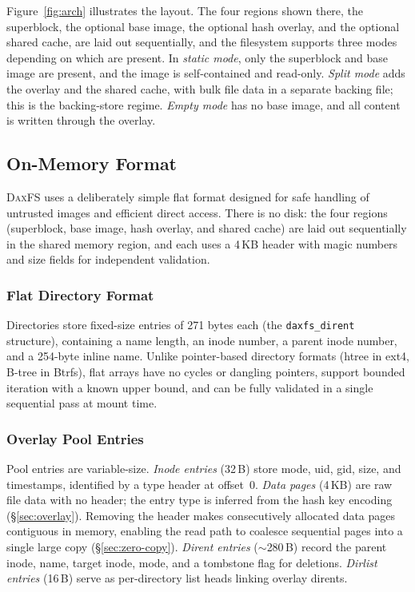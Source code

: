 \documentclass[letterpaper,twocolumn,10pt]{article}
\newcommand{\daxfs}{\textsc{DaxFS}\xspace}
\begin{document}
Figure~\ref{fig:arch} illustrates the layout.  The four regions shown
there, the superblock, the optional base image, the optional hash
overlay, and the optional shared cache, are laid out sequentially, and
the filesystem supports three modes depending on which are present.
In \emph{static mode}, only the superblock and base image are present,
and the image is self-contained and read-only.  \emph{Split mode} adds
the overlay and the shared cache, with bulk file data in a separate
backing file; this is the backing-store regime.  \emph{Empty mode} has
no base image, and all content is written through the overlay.

\subsection{On-Memory Format}
\label{sec:format}

\daxfs uses a deliberately simple flat format designed for safe
handling of untrusted images and efficient direct access.  There is no
disk: the four regions (superblock, base image, hash overlay, and
shared cache) are laid out sequentially in the shared memory region,
and each uses a 4\,KB header with magic numbers and size fields for
independent validation.

\subsubsection{Flat Directory Format}

Directories store fixed-size entries of 271 bytes each (the
\texttt{daxfs\_dirent} structure), containing a name length, an inode
number, a parent inode number, and a 254-byte inline name.  Unlike
pointer-based directory formats (htree in ext4, B-tree in Btrfs),
flat arrays have no cycles or dangling pointers, support bounded
iteration with a known upper bound, and can be fully validated in a
single sequential pass at mount time.

\subsubsection{Overlay Pool Entries}

Pool entries are variable-size.  \emph{Inode entries} (32\,B) store
mode, uid, gid, size, and timestamps, identified by a type header at
offset~0.  \emph{Data pages} (4\,KB) are raw file data with no
header; the entry type is inferred from the hash key encoding
(\S\ref{sec:overlay}).  Removing the header makes consecutively
allocated data pages contiguous in memory, enabling the read path to
coalesce sequential pages into a single large copy
(\S\ref{sec:zero-copy}).  \emph{Dirent entries} ($\sim$280\,B) record
the parent inode, name, target inode, mode, and a tombstone flag for
deletions.  \emph{Dirlist entries} (16\,B) serve as per-directory list
heads linking overlay dirents.
\end{document}
